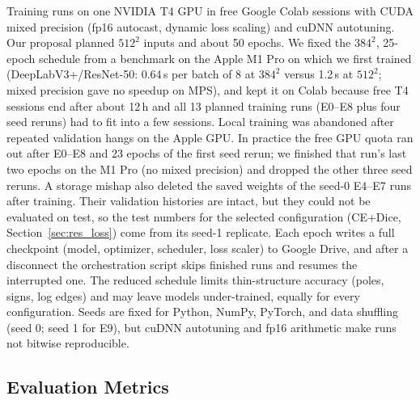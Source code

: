 Training runs on one NVIDIA T4 GPU in free Google Colab sessions with CUDA
mixed precision (fp16 autocast, dynamic loss scaling) and cuDNN autotuning. Our
proposal planned $512^2$ inputs and about 50 epochs. We fixed the $384^2$,
25-epoch schedule from a benchmark on the Apple M1 Pro on which we first
trained (DeepLabV3+/ResNet-50: 0.64\,s per batch of 8 at $384^2$ versus 1.2\,s
at $512^2$; mixed precision gave no speedup on MPS), and kept it on Colab
because free T4 sessions end after about 12\,h and all 13 planned training runs (E0--E8
plus four seed reruns) had to fit into a few sessions. Local training was
abandoned after repeated validation hangs on the Apple GPU. In practice the
free GPU quota ran out after E0--E8 and 23 epochs of the first seed rerun; we
finished that run's last two epochs on the M1 Pro (no mixed precision) and
dropped the other three seed reruns. A storage mishap also deleted the saved
weights of the seed-0 E4--E7 runs after training. Their validation histories
are intact, but they could not be evaluated on test, so the test numbers for
the selected configuration (CE+Dice, Section~\ref{sec:res_loss}) come from its
seed-1 replicate. Each epoch writes a
full checkpoint (model, optimizer, scheduler, loss scaler) to Google Drive, and
after a disconnect the orchestration script skips finished runs and resumes the
interrupted one. The reduced schedule limits thin-structure accuracy (poles,
signs, log edges) and may leave models under-trained, equally for every
configuration. Seeds are fixed for Python, NumPy, PyTorch, and data shuffling
(seed 0; seed 1 for E9), but cuDNN autotuning and fp16 arithmetic make
runs not bitwise reproducible.

\subsection{Evaluation Metrics}
\label{sec:metrics}

